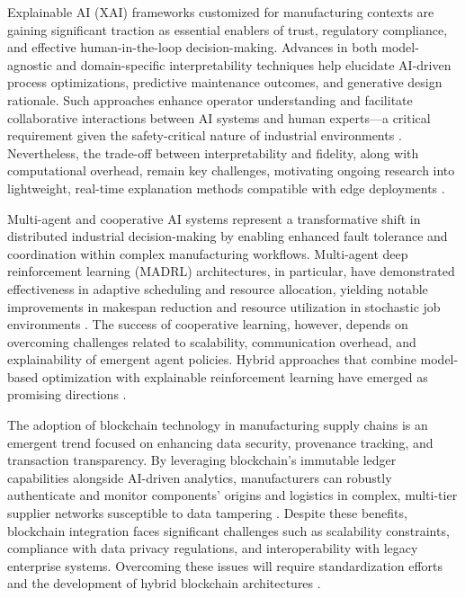 \documentclass[11pt]{article}
\begin{document}
Explainable AI (XAI) frameworks customized for manufacturing contexts are gaining significant traction as essential enablers of trust, regulatory compliance, and effective human-in-the-loop decision-making. Advances in both model-agnostic and domain-specific interpretability techniques help elucidate AI-driven process optimizations, predictive maintenance outcomes, and generative design rationale. Such approaches enhance operator understanding and facilitate collaborative interactions between AI systems and human experts—a critical requirement given the safety-critical nature of industrial environments \cite{ref35,ref44}. Nevertheless, the trade-off between interpretability and fidelity, along with computational overhead, remain key challenges, motivating ongoing research into lightweight, real-time explanation methods compatible with edge deployments \cite{ref38}.

Multi-agent and cooperative AI systems represent a transformative shift in distributed industrial decision-making by enabling enhanced fault tolerance and coordination within complex manufacturing workflows. Multi-agent deep reinforcement learning (MADRL) architectures, in particular, have demonstrated effectiveness in adaptive scheduling and resource allocation, yielding notable improvements in makespan reduction and resource utilization in stochastic job environments \cite{ref29}. The success of cooperative learning, however, depends on overcoming challenges related to scalability, communication overhead, and explainability of emergent agent policies. Hybrid approaches that combine model-based optimization with explainable reinforcement learning have emerged as promising directions \cite{ref29,ref37}.

The adoption of blockchain technology in manufacturing supply chains is an emergent trend focused on enhancing data security, provenance tracking, and transaction transparency. By leveraging blockchain’s immutable ledger capabilities alongside AI-driven analytics, manufacturers can robustly authenticate and monitor components’ origins and logistics in complex, multi-tier supplier networks susceptible to data tampering \cite{ref25}. Despite these benefits, blockchain integration faces significant challenges such as scalability constraints, compliance with data privacy regulations, and interoperability with legacy enterprise systems. Overcoming these issues will require standardization efforts and the development of hybrid blockchain architectures \cite{ref41}.
\end{document}
